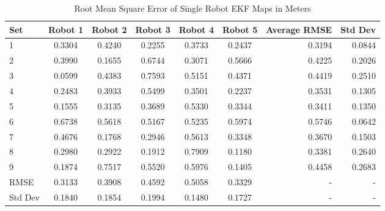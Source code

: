 \documentclass[12pt]{report}
\begin{document}
\begin{center}
\begin{table}[h]
  \caption{Root Mean Square Error of Single Robot EKF Maps in Meters}
  \begin{tabular}{| l | c | c | c | c | c || r ||r |}
    \hline
     Set & Robot 1 & Robot 2 & Robot 3 & Robot 4 & Robot 5 & Average RMSE & Std Dev \\ \hline \hline
     1 & 0.3304 & 0.4240 & 0.2255 & 0.3733 & 0.2437 & 0.3194 & 0.0844\\ \hline
     2 & 0.3990 & 0.1655 & 0.6744 & 0.3071 & 0.5666 & 0.4225 & 0.2026\\ \hline
     3 & 0.0599 & 0.4383 & 0.7593 & 0.5151 & 0.4371 & 0.4419 & 0.2510\\ \hline
     4 & 0.2483 & 0.3933 & 0.5499 & 0.3501 & 0.2237 & 0.3531 & 0.1305\\ \hline
     5 & 0.1555 & 0.3135 & 0.3689 & 0.5330 & 0.3344 & 0.3411 & 0.1350\\ \hline
     6 & 0.6738 & 0.5618 & 0.5167 & 0.5235 & 0.5974 & 0.5746 & 0.0642\\ \hline
     7 & 0.4676 & 0.1768 & 0.2946 & 0.5613 & 0.3348 & 0.3670 & 0.1503\\ \hline
     8 & 0.2980 & 0.2922 & 0.1912 & 0.7909 & 0.1180 & 0.3381 & 0.2640\\ \hline
     9 & 0.1874 & 0.7517 & 0.5520 & 0.5976 & 0.1405 & 0.4458 & 0.2683\\ \hline
    \hline
    RMSE & 0.3133 & 0.3908 & 0.4592 & 0.5058 & 0.3329 & - & -\\ \hline
    Std Dev & 0.1840 & 0.1854 & 0.1994 & 0.1480 & 0.1727 & - & -\\ \hline
    \hline
  \end{tabular}
  \end{table}
\end{center}
\end{document}
